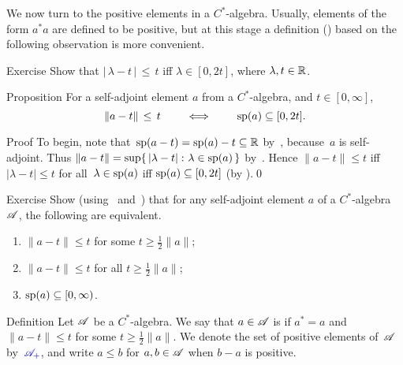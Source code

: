 \documentclass[main]{subfiles}
\begin{document}
\begin{parsec}%
\begin{point}%

We now turn to the positive elements 
in a $C^*$-algebra.
Usually,
elements of the form $a^*a$ are defined to be positive,
but at this stage a definition () based
on the following observation is more convenient.
\end{point}
\begin{point}{Exercise}%
Show that 
$\left|\,\lambda-t\,\right| \,\leq\, t$ iff  $\lambda \in[0,2t]$,
where $\lambda,t\in\mathbb{R}$.
\end{point}
\begin{point}{Proposition}%
For a self-adjoint element $a$ from a $C^*$-algebra,
and $t\in [0,\infty]$, 
\begin{equation*}
\|a-t\|\,\leq\, t\qquad\iff\qquad \mathrm{sp}(a)\subseteq [0,2t].
\end{equation*}%
\begin{point}{Proof}%
To begin, note that~$\mathrm{sp}(a-t)=\mathrm{sp}(a)-t\subseteq \mathbb{R}$ 
by~,
because~$a$ is self-adjoint.
Thus $\|a-t\|=\sup\{\,\left|\lambda-t\right|\colon \lambda\in \mathrm{sp}(a)\,\}$
by~.
Hence $\|a-t\|\leq t$
iff $\left|\lambda-t\right|\leq t$ for all~$\lambda\in\mathrm{sp}(a)$
iff $\mathrm{sp}(a)\subseteq [0,2t]$ (by ).\qed
\end{point}
\begin{point}{Exercise}%
Show
(using~ and~)
that
for any self-adjoint element $a$ of a $C^*$-algebra~$\mathscr{A}$,
the following are equivalent.
\begin{enumerate}
\item 
\label{cstar-pos-1}
$\|a-t\|\leq t$
for some $t\geq \frac{1}{2}\|a\|$;
\item 
\label{cstar-pos-2}
$\|a-t\|\leq t$
for all $t\geq \frac{1}{2}\|a\|$;
\item 
\label{cstar-pos-3}
$\mathrm{sp}(a)\subseteq[0,\infty)$.
\end{enumerate}
\end{point}
\end{point}
\begin{point}{Definition}%
Let $\mathscr{A}$ be a $C^*$-algebra.
We say that $a\in \mathscr{A}$
is  if $a^*=a$ and  $\|a-t\|\leq t$
for some $t\geq \frac{1}{2}\|a\|$.
We denote the set of positive elements of~$\mathscr{A}$ by~$\Define{\pos{\scrA}}$,
and write $a\leq b$ for $a,b\in\mathscr{A}$ when $b-a$ is positive.

\end{point}
\end{parsec}
\end{document}
